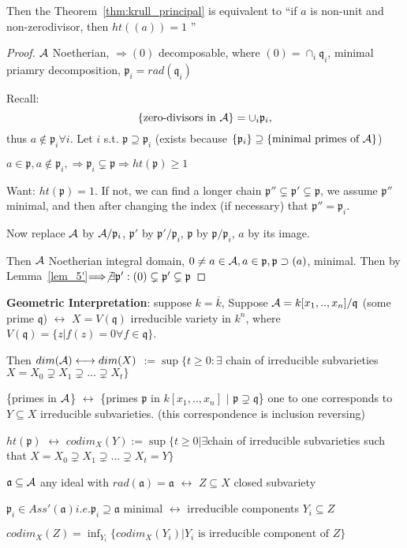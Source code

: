 \documentclass[11pt]{article}
\newcommand{\sca}{{\mathfrak a}}
\newcommand{\scp}{{\mathfrak p}}
\newcommand{\scq}{\mathfrak q}
\newcommand{\cala}{{\cal A}}
\newcommand{\Lrta}{\Longrightarrow}
\newcommand{\llrta}{\longleftrightarrow}
\begin{document}
Then the Theorem~\ref{thm:krull_principal} is equivalent to 
``if $a$ is non-unit and non-zerodivisor, then $ht((a))=1$ ''
\begin{proof}
$\cala$ Noetherian, $\Lrta (0)$ decomposable, where $(0)=\cap_i\scq_i$, minimal priamry decomposition, $\scp_i=rad(\scq_i)$

Recall:
$$
\{\text{zero-divisors in }\cala\} =\cup_i\scp_i,
$$
thus $a\notin\scp_i\forall i$. Let $i$ s.t. $\scp\supseteq \scp_i$ (exists because $\{\scp_i\}\supseteq \{\text{minimal primes of $\cala$}\}$)

$a\in\scp ,a\notin \scp_i,\Lrta\scp_i\subsetneq \scp\Lrta ht(\scp)\geq 1$

Want: $ht(\scp)=1$. If not, we can find a longer chain $\scp''\subsetneq \scp'\subsetneq \scp$, we assume $\scp''$ minimal, and then after changing the index (if necessary) that $\scp''=\scp_i$.

Now replace
$\cala$ by $\cala/\scp_i$, $\scp'$ by $\scp'/\scp_i$, $\scp$ by $\scp/\scp_i$, $a$ by its image.

Then $\cala$ Noetherian integral domain, $0\neq a\in \cala,a\in\scp,\scp\supset(a)$, minimal.
Then by Lemma~\ref{lem_5'}$\Lrta \not \exists \scp':(0)\subsetneq \scp'\subsetneq \scp$
\end{proof}

\textbf{Geometric Interpretation}: suppose $k=\overline{k}$,
Suppose $\cala=k[x_1,..,x_n]/\scq$ (some prime $\scq$) $\llrta$ $X=V(\scq)$ irreducible variety in $k^n$, where $V(\scq)=\{z|f(z)=0\forall f\in\scq\}$.

Then $dim(\cala)\llrta dim(X)$ $:=\sup\{t\geq 0:\exists$ chain of irreducible subvarieties $ X=X_0\supsetneq X_1\supsetneq ...\supsetneq X_t\}$

\{primes in $\cala$\} $\llrta$ \{primes $\scp$ in $k[x_1,..,x_n]$ $|$ $\scp\supsetneq \scq$\} one to one corresponds to $Y\subseteq X$ irreducible subvarieties. (this correspondence is inclusion reversing)

$ht(\scp)$ $\llrta$ $codim_X(Y):=\sup\{t\geq 0|\exists $chain of irreducible subvarieties such that $X=X_0\supsetneq X_1\supsetneq ...\supsetneq X_t=Y\}$

$\sca\subseteq\cala$ any ideal with $rad(\sca)=\sca $ $\llrta$ $Z\subseteq X$ closed subvariety

$\scp_i\in Ass'(\sca) i.e. \scp_i\supseteq \sca$ minimal $\llrta$ irreducible components $Y_i\subseteq Z$

$codim_X(Z)=\inf_{Y_i}\{ codim_X(Y_i)| \text{$Y_i$ is irreducible component of $Z$}\}$
\end{document}
